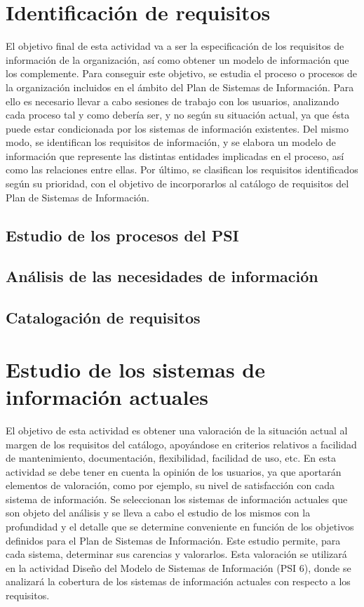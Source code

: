 \documentclass[12pt,a4paper,titlepage,spanish,twoside]{book}
\begin{document}
{\section{Identificación de requisitos}
El objetivo final de esta actividad va a ser la especificación de los requisitos
de información de la organización, así como obtener un modelo de información que
los complemente.
Para conseguir este objetivo, se estudia el proceso o procesos de la 
organización incluidos en el ámbito del Plan de Sistemas de Información. Para 
ello es necesario llevar a cabo sesiones de trabajo con los usuarios, analizando
cada proceso tal y como debería ser, y no según su situación actual, ya que ésta
puede estar condicionada por los sistemas de información existentes.
Del mismo modo, se identifican los requisitos de información, y se elabora un 
modelo de información que represente las distintas entidades implicadas en el 
proceso, así como las relaciones entre ellas.
Por último, se clasifican los requisitos identificados según su prioridad, con 
el objetivo de incorporarlos al catálogo de requisitos del Plan de Sistemas de 
Información.


\subsection{Estudio de los procesos del PSI}
\subsection{Análisis de las necesidades de información}
\subsection{Catalogación de requisitos}

\section{Estudio de los sistemas de información actuales}
El objetivo de esta actividad es obtener una valoración de la situación actual al margen de los requisitos del
catálogo, apoyándose en criterios relativos a facilidad de mantenimiento, documentación, flexibilidad, facilidad de
uso, etc. En esta actividad se debe tener en cuenta la opinión de los usuarios, ya que aportarán elementos de
valoración, como por ejemplo, su nivel de satisfacción con cada sistema de información.
Se seleccionan los sistemas de información actuales que son objeto del análisis y se lleva a cabo el estudio de los
mismos con la profundidad y el detalle que se determine conveniente en función de los objetivos definidos para el
Plan de Sistemas de Información. Este estudio permite, para cada sistema, determinar sus carencias y valorarlos.
Esta valoración se utilizará en la actividad Diseño del Modelo de Sistemas de Información (PSI 6), donde se
analizará la cobertura de los sistemas de información actuales con respecto a los requisitos.

}
\end{document}
